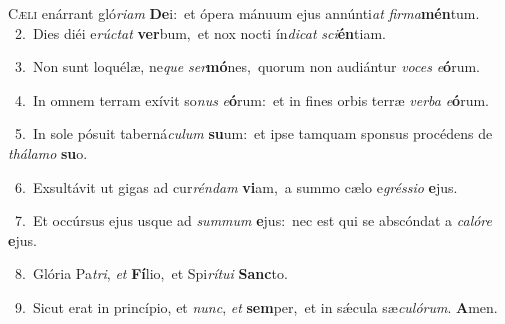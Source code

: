 \lettrine{\initial\textcolor{\initialcolor}{C}}{æli} enárrant gló\-\textit{ri}\-\textit{am} \textbf{De}\-i:~\star et ópera mánuum ejus annúnti\textit{at} \textit{fir}\-\textit{ma}\textbf{mén}tum.\\
{\numbfont\textcolor{\numbcolor}{~2.}}~Dies diéi e\-\textit{rúc}\-\textit{tat} \textbf{ver}\-bum,~\star et nox nocti ín\-\textit{di}\-\textit{cat} \textit{sci}\-\textbf{én}tiam.\par
{\numbfont\textcolor{\numbcolor}{~3.}}~Non sunt loquélæ, ne\textit{que} \textit{ser}\-\textbf{mó}nes,~\star quorum non audiántur \textit{vo}\-\textit{ces} \textit{e}\-\textbf{ó}rum.\par
{\numbfont\textcolor{\numbcolor}{~4.}}~In omnem terram exívit so\textit{nus} \textit{e}\-\textbf{ó}rum:~\star et in fines orbis terræ \textit{ver}\-\textit{ba} \textit{e}\-\textbf{ó}rum.\par
{\numbfont\textcolor{\numbcolor}{~5.}}~In sole pósuit taberná\-\textit{cu}\-\textit{lum} \textbf{su}\-um:~\star et ipse tamquam sponsus procédens de \textit{thá}\-\textit{la}\textit{mo} \textbf{su}\-o.\par
{\numbfont\textcolor{\numbcolor}{~6.}}~Exsultávit ut gigas ad cur\-\textit{rén}\-\textit{dam} \textbf{vi}\-am,~\star a summo cælo e\-\textit{grés}\-\textit{si}\textit{o} \textbf{e}\-jus.\par
{\numbfont\textcolor{\numbcolor}{~7.}}~Et occúrsus ejus usque ad \textit{sum}\-\textit{mum} \textbf{e}\-jus:~\star nec est qui se abscóndat a \textit{ca}\-\textit{ló}\textit{re} \textbf{e}\-jus.\par
{\numbfont\textcolor{\numbcolor}{~8.}}~Glória Pa\-\textit{tri}\-, \textit{et} \textbf{Fí}\-lio,~\star et Spi\-\textit{rí}\-\textit{tu}\textit{i} \textbf{Sanc}\-to.\par
{\numbfont\textcolor{\numbcolor}{~9.}}~Sicut erat in princípio, et \textit{nunc}\-, \textit{et} \textbf{sem}\-per,~\star et in sǽcula sæ\-\textit{cu}\-\textit{ló}\textit{rum}. \textbf{A}\-men.\par

